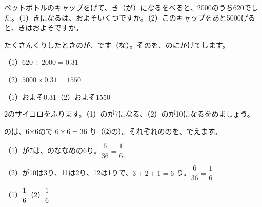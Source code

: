 \begin{reidai}[\R{実験}{じっ|けん}から\R{確率}{かく|りつ}を\R{求}{もと}める]
ペットボトルのキャップをげて、き（が）になるをべると、2000のうち620でした。（1）きになるは、およそいくつですか。（2）このキャップをあと5000げると、きはおよそですか。\par
\kangaekata たくさんくりしたときのが、です（な）。そのを、のにかけてします。\par
\shiki（1）\nobreak $620\div2000=0.31$\par
\hspace*{2.6\zw}（2）\nobreak $5000\times0.31=1550$\par
\kotae（1）\nobreak およそ0.31\quad（2）\nobreak およそ1550
\end{reidai}

\begin{reidai}[2\R{個}{こ}のサイコロの\R{確率}{かく|りつ}]
2のサイコロをふります。（1）のが7になる、（2）のが10になるをめましょう。\par
\kangaekata {}のは、6×6ので $6\times6=36$ り（②の）。それぞれののを、でえます。\par
\shiki（1）\nobreak {}が7は、のななめの6り。$\dfrac{6}{36}=\dfrac{1}{6}$\par
\hspace*{2.6\zw}（2）\nobreak {}が10は3り、11は2り、12は1りで、$3+2+1=6$ り。$\dfrac{6}{36}=\dfrac{1}{6}$\par
\kotae（1）\nobreak $\dfrac{1}{6}$\quad（2）\nobreak $\dfrac{1}{6}$
\end{reidai}

